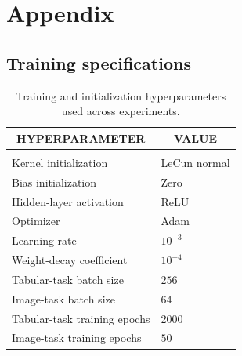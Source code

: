 \documentclass[10pt]{article} %
\begin{document}



\appendix

\section{Appendix}

\subsection{Training specifications} \label{ap:hyperparams}


\begin{table}[t]
\caption{Training and initialization hyperparameters used across experiments.}
\label{tab:training-hyperparameters}
\begin{center}
\begin{tabular}{ll}
\multicolumn{1}{c}{\bf HYPERPARAMETER}
&
\multicolumn{1}{c}{\bf VALUE}
\\ \hline \\
Kernel initialization          & LeCun normal \\
Bias initialization            & Zero \\
Hidden-layer activation        & ReLU \\
Optimizer                      & Adam \\
Learning rate                  & $10^{-3}$ \\
Weight-decay coefficient       & $10^{-4}$ \\
Tabular-task batch size        & $256$ \\
Image-task batch size          & $64$ \\
Tabular-task training epochs   & $2000$ \\
Image-task training epochs     & $50$ \\
\end{tabular}
\end{center}
\end{table}
\end{document}
